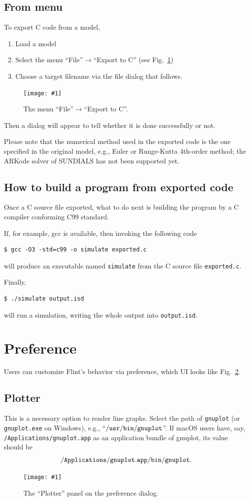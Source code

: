 \documentclass[a4paper,10pt]{report}
\newcommand\FigureOfImage[2]{\begin{figure}[h]
  \centering
  \texttt{[image: \#1]}
  \caption{#2}\label{fig:#1}
\end{figure}}
\begin{document}
\subsection{From menu}
To export C code from a model,
\begin{enumerate}
\item Load a model
\item Select the menu ``File''$\rightarrow$``Export to C'' (see Fig.~\ref{fig:export-to-c})
\item Choose a target filename via the file dialog that follows.
\end{enumerate}
\FigureOfImage{export-to-c}{The menu ``File''$\rightarrow$``Export to C''.}
Then a dialog will appear to tell whether it is done successfully or not.

Please note that the numerical method used in the exported code is the one
specified in the original model, e.g., Euler or Runge-Kutta 4th-order method;
the ARKode solver of SUNDIALS has not been supported yet.

\subsection{How to build a program from exported code}
Once a C source file exported, what to do next is building the program by a C compiler
conforming C99 standard.

If, for example, gcc is available, then invoking the following code
\begin{verbatim}
$ gcc -O3 -std=c99 -o simulate exported.c
\end{verbatim}
will produce an executable named {\tt simulate} from the C source file {\tt exported.c}.

Finally,
\begin{verbatim}
$ ./simulate output.isd
\end{verbatim}
will run a simulation, writing the whole output into {\tt output.isd}.

\section{Preference}
\label{sec:preference}
Users can customize Flint's behavior via preference, which UI looks like
Fig.~\ref{fig:preference-plotter}.

\subsection{Plotter}
This is a necessary option to render line graphs.
Select the path of {\tt gnuplot} (or {\tt gnuplot.exe} on Windows), e.g.,
``$\tt{/usr/bin/gnuplot}$''. If macOS users have, say,
{\tt /Applications/gnuplot.app} as an application bundle of gnuplot,
its value should be \[{\tt /Applications/gnuplot.app/bin/gnuplot}.\]
\FigureOfImage{preference-plotter}{The ``Plotter'' panel on the preference dialog.}
\end{document}
